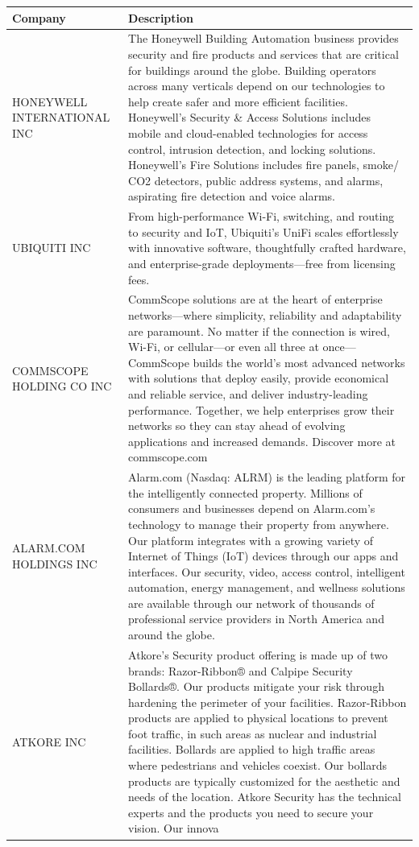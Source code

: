 \begin{tabular}{>{\raggedright\arraybackslash}p{3.5cm}>{\raggedright\arraybackslash}p{20cm}}
 Company & Description \\ 
  \midrule
HONEYWELL INTERNATIONAL INC & The Honeywell Building Automation business provides security and fire products and services that are critical for buildings around the globe. Building operators across many verticals depend on our technologies to help create safer and more efficient facilities. Honeywell’s Security \& Access Solutions includes mobile and cloud-enabled technologies for access control, intrusion detection, and locking solutions. Honeywell’s Fire Solutions includes fire panels, smoke/ CO2 detectors, public address systems, and alarms, aspirating fire detection and voice alarms. \\ 
   \midrule
UBIQUITI INC & From high-performance Wi-Fi, switching, and routing to security and IoT, Ubiquiti’s UniFi scales effortlessly with innovative software, thoughtfully crafted hardware, and enterprise-grade deployments—free from licensing fees. \\ 
   \midrule
COMMSCOPE HOLDING CO INC & CommScope solutions are at the heart of enterprise networks—where simplicity, reliability and adaptability are paramount. No matter if the connection is wired, Wi-Fi, or cellular—or even all three at once— CommScope builds the world’s most advanced networks with solutions that deploy easily, provide economical and reliable service, and deliver industry-leading performance. Together, we help enterprises grow their networks so they can stay ahead of evolving applications and increased demands. Discover more at commscope.com \\ 
   \midrule
ALARM.COM HOLDINGS INC & Alarm.com (Nasdaq: ALRM) is the leading platform for the intelligently connected property. Millions of consumers and businesses depend on Alarm.com's technology to manage their property from anywhere. Our platform integrates with a growing variety of Internet of Things (IoT) devices through our apps and interfaces. Our security, video, access control, intelligent automation, energy management, and wellness solutions are available through our network of thousands of professional service providers in North America and around the globe. \\ 
   \midrule
ATKORE INC & Atkore’s Security product offering is made up of two brands: Razor-Ribbon® and Calpipe Security Bollards®. Our products mitigate your risk through hardening the perimeter of your facilities. Razor-Ribbon products are applied to physical locations to prevent foot traffic, in such areas as nuclear and industrial facilities. Bollards are applied to high traffic areas where pedestrians and vehicles coexist. Our bollards products are typically customized for the aesthetic and needs of the location. Atkore Security has the technical experts and the products you need to secure your vision. Our innova \\ 

\end{tabular}
